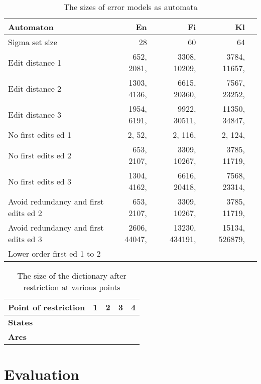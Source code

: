 \documentclass[11pt]{article}
\begin{document}
\begin{table}[h]
\begin{center}
\begin{scriptsize}
\begin{tabular}{|l|rrrr|}
\hline
\bf Automaton & \bf En & \bf Fi & \bf Kl  \\ 
\hline
Sigma set size &
 28& 60& 64
\\
Edit distance 1 &
 652, 2081,& 3308, 10209,& 3784, 11657,
\\
Edit distance 2 &
 1303, 4136,& 6615, 20360,& 7567, 23252,
\\
Edit distance 3 &
 1954, 6191,& 9922, 30511,& 11350, 34847,
\\
No first edits ed 1 & 
 2, 52,& 2, 116,& 2, 124,
\\
No first edits ed 2 &
 653, 2107,& 3309, 10267,& 3785, 11719,
\\
No first edits ed 3 &
 1304, 4162,& 6616, 20418,& 7568, 23314,
\\
Avoid redundancy and first edits ed 2 &
 653, 2107,& 3309, 10267,& 3785, 11719,
\\
Avoid redundancy and first edits ed 3 &
 2606, 44047,& 13230, 434191,& 15134, 526879,
\\
Lower order first ed 1 to 2 &
&&
\\
\end{tabular}
\end{scriptsize}
\end{center}
\caption{\label{table:error-sizes}
The sizes of error models as automata}
\end{table}


\begin{table}[h]
\begin{center}
\begin{scriptsize}
\begin{tabular}{|l|rrrr|}
\hline
\bf Point of restriction & \bf 1 & \bf 2 & \bf 3 & \bf 4 \\
\hline
\bf States \\
\bf Arcs \\
\hline
\end{tabular}
\caption{\label{restricted} The size of the dictionary after restriction at
various points}
\end{scriptsize}
\end{center}
\end{table}


\section{Evaluation}
\label{sec:evaluation}
\end{document}
